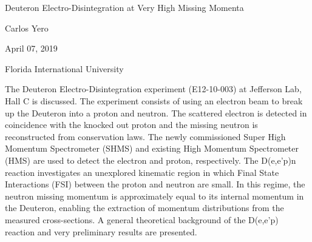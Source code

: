\documentclass[a4paper]{article}
\begin{document}

\Large
 \begin{center}
Deuteron Electro-Disintegration at Very High Missing Momenta\\ 

\hspace{10pt}

\large
Carlos Yero \\

\hspace{10pt}

April 07, 2019 \\

\hspace{10pt}

\small  
Florida International University\\

\end{center}

\hspace{10pt}

\normalsize

\noindent The Deuteron Electro-Disintegration experiment (E12-10-003) at Jefferson Lab, Hall C is discussed.  The experiment
consists of using an electron beam to break up the Deuteron into a proton and neutron. The scattered electron is detected in
coincidence with the knocked out proton and the missing neutron is reconstructed from conservation laws. The newly commissioned Super High
Momentum Spectrometer (SHMS) and existing High Momentum Spectrometer (HMS) are used to detect the electron and proton, respectively. The
D(e,e'p)n reaction investigates an unexplored kinematic region in which Final State Interactions (FSI) between the proton and neutron are small. In this
regime, the neutron missing momentum is approximately equal to its internal momentum in the Deuteron, enabling the extraction of momentum distributions
from the measured cross-sections. A general theoretical background of the D(e,e'p) reaction and very preliminary results are presented.
\end{document}
